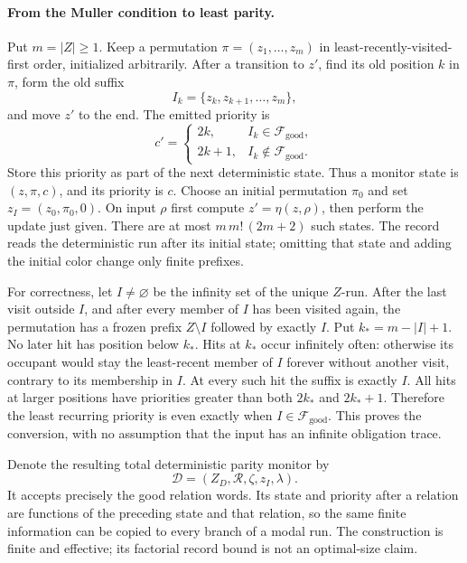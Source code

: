 \paragraph{From the Muller condition to least parity.}
\label{sec:p09-muller-parity-record}
Put \(m=|Z|\geq1\).
Keep a permutation
\(\pi=(z_1,\ldots,z_m)\)
in least-recently-visited-first
order, initialized arbitrarily.
After a transition to \(z'\),
find its old position \(k\)
in \(\pi\), form the old suffix
\[
 I_k=\{z_k,z_{k+1},\ldots,z_m\},
\]
and move \(z'\) to the end.
The emitted priority is
\[
 c'=
 \begin{cases}
  2k,&I_k\in\mathcal F_{\mathrm{good}},\\
  2k+1,&I_k\notin\mathcal F_{\mathrm{good}}.
 \end{cases}
\]
Store this priority as part of
the next deterministic state.
Thus a monitor state is
\((z,\pi,c)\), and its priority
is \(c\). Choose an initial
permutation \(\pi_0\) and set
\(z_I=(z_0,\pi_0,0)\).
On input \(\rho\)
first compute \(z'=\eta(z,\rho)\),
then perform the update just given.
There are at most
\(m\,m!\,(2m+2)\) such states.
The record reads the deterministic
run after its initial state;
omitting that state and adding
the initial color change only
finite prefixes.

For correctness, let \(I\ne\varnothing\)
be the infinity set of the
unique \(Z\)-run.
After the last visit outside
\(I\), and after every member
of \(I\) has been visited again,
the permutation has a frozen
prefix \(Z\setminus I\) followed
by exactly \(I\).
Put \(k_*=m-|I|+1\).
No later hit has position
below \(k_*\).
Hits at \(k_*\) occur infinitely
often: otherwise its occupant
would stay the least-recent
member of \(I\) forever without
another visit, contrary to its
membership in \(I\).
At every such hit the suffix
is exactly \(I\).
All hits at larger positions
have priorities greater than
both \(2k_*\) and \(2k_*+1\).
Therefore the least recurring
priority is even exactly when
\(I\in\mathcal F_{\mathrm{good}}\).
This proves the conversion,
with no assumption that the
input has an infinite obligation
trace.

Denote the resulting total
deterministic parity monitor by
\[
 \mathcal D=(Z_D,\mathcal R,\zeta,z_I,\lambda).
\]
It accepts precisely the good
relation words. Its state and
priority after a relation are
functions of the preceding state
and that relation, so the same
finite information can be copied
to every branch of a modal run.
The construction is finite and
effective; its factorial record
bound is not an optimal-size
claim.

